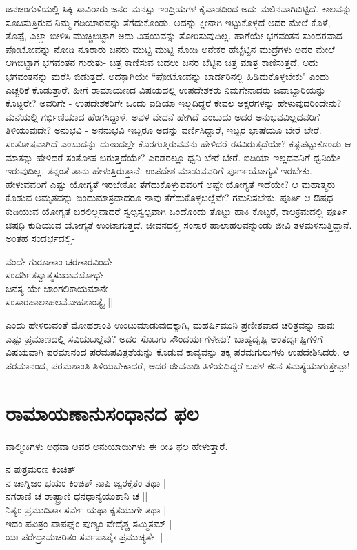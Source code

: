 ಜನಜಂಗುಳಿಯಲ್ಲಿ ಸಿಕ್ಕಿ ಸಾವಿರಾರು ಜನರ ಮನಸ್ಸು ಇಂದ್ರಿಯಗಳ ಕೈವಾಡದಿಂದ ಅದು ಮಲಿನವಾಗಿಬಿಟ್ಟಿದೆ. ಕಾಲವನ್ನು ಸೂಚಿಸುತ್ತಿರುವ ನಿಮ್ಮ ಗಡಿಯಾರವನ್ನು ತೆಗೆದುಕೊಂಡು, ಅದನ್ನು ಕ್ಲೀನಾಗಿ ಇಟ್ಟುಕೊಳ್ಳದೆ ಅದರ ಮೇಲೆ ಕೊಳೆ, ತೊಪ್ಪೆ, ಎಲ್ಲಾ ಬೀಳಿಸಿ ಮುಚ್ಚಿಬಿಟ್ಟಾಗ ಅದು ವಿಷಯವನ್ನು ತೋರಿಸುವುದಿಲ್ಲ. ಹಾಗೆಯೇ ಭಗವಂತನ ಸುಂದರವಾದ ಪೋಟೋವನ್ನು ನೋಡಿ ನೂರಾರು ಜನರು ಮುಟ್ಟಿ ಮುಟ್ಟಿ ನೋಡಿ ಅನೇಕರ ಹೆಬ್ಬೆಟ್ಟಿನ ಮುದ್ರೆಗಳು ಅದರ ಮೇಲೆ ಆಗಿಬಿಟ್ಟಾಗ ಭಗವಂತನ ಗುರುತು- ಚಿತ್ರ ಕಾಣಿಸುವ ಬದಲು ಜನರ ಬೆಟ್ಟಿನ ಚಿತ್ರ ಮಾತ್ರ ಕಾಣಿಸುತ್ತದೆ. ಅದು ಭಗವಂತನನ್ನು ಮರೆಸಿ ಬಿಡುತ್ತದೆ. ಅದಕ್ಕಾಗಿಯೇ ``ಪೋಟೋವನ್ನು ಬಾರ್ಡರಿನಲ್ಲಿ ಹಿಡಿದುಕೊಳ್ಳಬೇಕು" ಎಂದು ಎಚ್ಚರಿಕೆ ಕೊಡುತ್ತಾರೆ. ಹೀಗೆ ರಾಮಾಯಣದ ವಿಷಯದಲ್ಲಿ ಉಪದೇಶಕರು ನಿಮಗೇನಾದರು ಜವಾಬ್ದಾರಿಯನ್ನು ಕೊಟ್ಟರೇ? ಅವರಿಗೇ - ಉಪದೇಶಕರಿಗೇ ಒಂದು ಐಡಿಯಾ ಇಲ್ಲದಿದ್ದರೆ ಕೇವಲ ಅಕ್ಷರಗಳನ್ನು ಹೇಳುವುದರಿಂದೇನು? ಮನೆಯಲ್ಲಿ ಗರ್ಭಿಣಿಯಾದ ಹೆಂಗಸಿದ್ದಾಳೆ. ಅವಳ ವೇದನೆ ಹೇಗಿದೆ ಎಂಬುದು ಅದರ ಅನುಭವವಿಲ್ಲದವರಿಗೆ ತಿಳಿಯುವುದೇ? ಅನುಭವಿ - ಅನನುಭವಿ ಇಬ್ಬರೂ ಅದನ್ನು ವರ್ಣಿಸಿದ್ದಾರೆ, ಇಬ್ಬರ ಭಾಷೆಯೂ ಬೇರೆ ಬೇರೆ. ಸಂತೋಷವಾಗಿದೆ ಎಂಬುದನ್ನು ದುಃಖದಲ್ಲೇ ಕೊರಗುತ್ತಿರುವವನು ಹೇಳಿದರೆ ರಸವಿರುತ್ತದೆಯೇ? ಕಷ್ಟಪಟ್ಟುಕೊಂಡು ಆ ಮಾತನ್ನು ಹೇಳಿದರೆ ಸಂತೋಷ ಬರುತ್ತದೆಯೇ? ಎರಡರಲ್ಲೂ ಧ್ವನಿ ಬೇರೆ ಬೇರೆ. ಐಡಿಯಾ ಇಲ್ಲದವನಿಗೆ ಧ್ವನಿಯೇ ಇರುವುದಿಲ್ಲ. ತನ್ನಂತೆ ತಾನು ಹೇಳುತ್ತಿರುತ್ತಾನೆ. ಉಪದೇಶ ಮಾಡುವವರಿಗೆ ಪೂರ್ಣಯೋಗ್ಯತೆ ಇರಬೇಕು. ಹೇಳುವವರಿಗೆ ಎಷ್ಟು ಯೋಗ್ಯತೆ ಇರಬೇಕೋ ತೆಗೆದುಕೊಳ್ಳುವವರಿಗೆ ಅಷ್ಟೇ ಯೋಗ್ಯತೆ ಇದೆಯೇ? ಆ ಮಹಾತ್ಮರು ಕೊಡುವ ಅಮೃತವನ್ನು ಬಿಂದುಮಾತ್ರವಾದರೂ ನಾವು ತೆಗೆದುಕೊಳ್ಳಬಲ್ಲೆವೇ? ಗಮನಿಸಬೇಕು. ಪೂರ್ತಿ ಆ ಔಷಧ ಕುಡಿಯುವ ಯೋಗ್ಯತೆ ಬರಲಿಲ್ಲವಾದರೆ ಸ್ವಲ್ಪಸ್ವಲ್ಪವಾಗಿ ಒಂದೊಂದು ತೊಟ್ಟು ಹಾಕಿ ಕೊಟ್ಟರೆ, ಕಾಲಕ್ರಮದಲ್ಲಿ ಪೂರ್ತಿ ಔಷಧಿ ಕುಡಿಯುವ ಯೋಗ್ಯತೆ ಉಂಟಾಗುತ್ತದೆ. ಜೀವನದಲ್ಲಿ ಸಂಸಾರ ಹಾಲಾಹಲವನ್ನುಂಡು ಜೀವಿ ತಳಮಳಿಸುತ್ತಿದ್ದಾನೆ. ಅಂತಹ ಸಂದರ್ಭದಲ್ಲಿ- 


\begin{shloka}
ವಂದೇ ಗುರೂಣಾಂ ಚರಣಾರವಿಂದೇ\\ 
ಸಂದರ್ಶಿತಸ್ವಾತ್ಮಸುಖಾವಬೋಧೇ |\\ 
ಜನಸ್ಯ ಯೇ ಜಾಂಗಲಿಕಾಯಮಾನೇ\\ 
ಸಂಸಾರಹಾಲಾಹಲಮೋಹಶಾಂತ್ಯೈ ||
\end{shloka} 


ಎಂದು ಹೇಳಿರುವಂತೆ ಮೋಹಶಾಂತಿ ಉಂಟುಮಾಡುವುದಕ್ಕಾಗಿ, ಮಹರ್ಷಿಮುನಿ ಪ್ರಣೀತವಾದ ಚರಿತ್ರವನ್ನು ನಾವು ಎಷ್ಟು ಪ್ರಮಾಣದಲ್ಲಿ ಸವಿಯಬಲ್ಲೆವು? ಅದರ ಸೊಬಗು ಸೌಂದರ್ಯಗಳೇನು? ಬಾಹ್ಯದೃಷ್ಟಿ ಅಂತರ್ದೃಷ್ಟಿಗಳಿಗೆ ವಿಷಯವಾಗಿ ಪರಮಾನಂದ ಪರಮಪವಿತ್ರತೆಯನ್ನು ಕೊಡುವ ಕಾವ್ಯವನ್ನು ತಕ್ಕ ಪರಮಗುರುಗಳು ಉಪದೇಶಿಸಿದರು. ಆ ಪರಮಾನಂದ, ಪರಮಶಾಂತಿ ತಿಳಿಯಬೇಕಾದರೆ, ಅದರ ಜೀವನಾಡಿ ತಿಳಿಯದಿದ್ದರೆ ಬಹಳ ಕಠಿನ ಸಮಸ್ಯೆಯಾಗುತ್ತೇಪ್ಪಾ! 


\section*{ರಾಮಾಯಣಾನುಸಂಧಾನದ ಫಲ}

ವಾಲ್ಮೀಕಿಗಳು ಅಥವಾ ಅವರ ಅನುಯಾಯಿಗಳು ಈ ರೀತಿ ಫಲ ಹೇಳುತ್ತಾರೆ. 

\begin{shloka} 
ನ ಪುತ್ರಮರಣ ಕಿಂಚಿತ್‍\label{180}\\
ನ ಚಾಗ್ನಿಜಂ ಭಯಂ ಕಿಂಚಿತ್‍ ನಾಪಿ ಜ್ವರಕೃತಂ ತಥಾ |\\ 
ನಗರಾಣಿ ಚ ರಾಷ್ಟ್ರಾಣಿ ಧನಧಾನ್ಯಯುತಾನಿ ಚ ||\\ 
ನಿತ್ಯಂ ಪ್ರಮುದಿತಾಃ ಸರ್ವೇ ಯಥಾ ಕೃತಯುಗೇ ತಥಾ |\\ 
ಇದಂ ಪವಿತ್ರಂ ಪಾಪಘ್ನಂ ಪುಣ್ಯಂ ವೇದೈಶ್ಚ ಸಮ್ಮಿತಮ್‍ |\label{181}\\ 
ಯಃ ಪಠೇದ್ರಾಮಚರಿತಂ ಸರ್ವಪಾಪೈಃ ಪ್ರಮುಚ್ಯತೇ ||
\end{shloka} 


